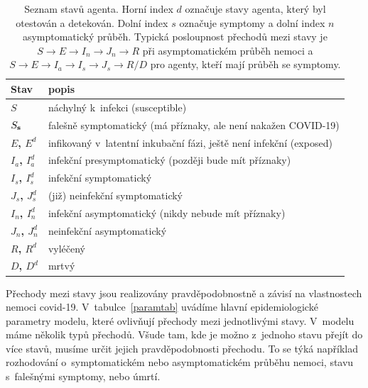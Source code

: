 \begin{table}
\centering
  \begin{tabular}{lp{}}
    \hline
		Stav & popis \\\hline
    {\bf $S$} & náchylný k~infekci (susceptible)\\
    {\bf $S_{\bf s}$} & falešně symptomatický (má příznaky, ale není nakažen COVID-19)\\ 
    {\bf $E$, $E^d$} & infikovaný v~latentní inkubační fázi, ještě není infekční (exposed) \\
    {\bf $I_{a}$, $I^d_{a}$} & infekční presymptomatický (později bude mít příznaky) \\
    {\bf $I_{s}$, $I^d_{s}$} & infekční symptomatický \\ 
    {\bf $J_{s}$, $J^d_{s}$} & (již) neinfekční symptomatický \\ 
    {\bf $I_{n}$, $I^d_{n}$} & infekční asymptomatický (nikdy nebude mít příznaky) \\ 
    {\bf $J_{ n}$, $J^d_{n}$} & neinfekční asymptomatický \\ 
    {\bf $R$, $R^{d}$} & vyléčený \\
    {\bf $D$, $D^{d}$} & mrtvý  \\
    \hline
  \end{tabular}
  \caption{Seznam stavů agenta. Horní index $d$ označuje stavy agenta, který byl otestován a detekován. Dolní index $s$ označuje symptomy a dolní index $n$ asymptomatický průběh. Typická posloupnost přechodů mezi stavy je $ S \rightarrow  E \rightarrow I_n \rightarrow J_n \rightarrow R$ při asymptomatickém průběh nemoci a $S \rightarrow E \rightarrow I_a \rightarrow I_s \rightarrow J_s \rightarrow R/D$ pro agenty, kteří mají průběh se symptomy.}
  \label{tab:states}
\end{table} 

Přechody mezi stavy jsou realizovány pravděpodobnostně a závisí na vlastnostech nemoci covid-19. V~tabulce~\ref{paramtab} uvádíme hlavní epidemiologické parametry modelu, které ovlivňují přechody mezi jednotlivými stavy. V~modelu máme několik typů přechodů. Všude tam, kde je možno z~jednoho stavu přejít do více stavů, musíme určit jejich pravděpodobnosti přechodu. To se týká například rozhodování o~symptomatickém nebo asymptomatickém průběhu nemoci, stavu s~falešnými symptomy, nebo úmrtí. 

